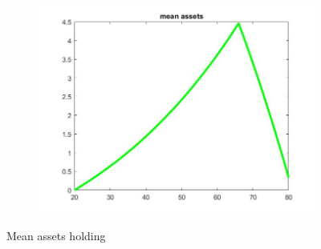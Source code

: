\documentclass[12pt,a4paper]{article}
\begin{document}
\begin{figure}[h!]
\begin{subfigure}[b]{0.32\linewidth}
    \includegraphics[width=\linewidth]{graphs/Q2/mean_asset3.jpg}
  \end{subfigure}
  \caption{Mean assets holding}
    \label{fig:3}
\end{figure}
\end{document}
